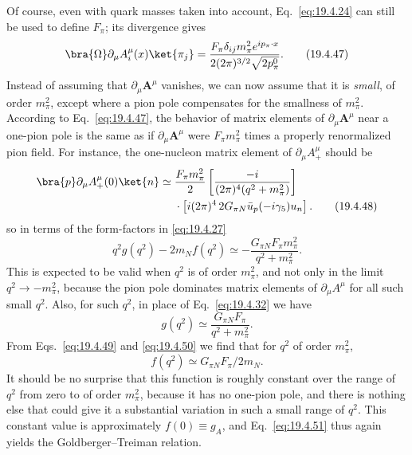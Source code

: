 Of course, even with quark masses taken into account, Eq.~\eqref{eq:19.4.24} can still be used to define $F_\pi$; its divergence gives
\begin{equation}
\bra{\Omega}\partial_\mu A_i^\mu(x)\ket{\pi_j}
=\frac{F_\pi\delta_{ij}m_\pi^2e^{ip_\pi\cdot x}}
{2(2\pi)^{3/2}\sqrt{2p_\pi^0}}.
\tag{19.4.47}\label{eq:19.4.47}
\end{equation}
Instead of assuming that $\partial_\mu\mathbf{A}^\mu$ vanishes, we can now assume that it is \emph{small}, of order $m_\pi^2$, except where a pion pole compensates for the smallness of $m_\pi^2$. According to Eq.~\eqref{eq:19.4.47}, the behavior of matrix elements of $\partial_\mu\mathbf{A}^\mu$ near a one-pion pole is the same as if $\partial_\mu\mathbf{A}^\mu$ were $F_\pi m_\pi^2$ times a properly renormalized pion field. For instance, the one-nucleon matrix element of $\partial_\mu A_+^\mu$ should be
\begin{align}
\bra{p}\partial_\mu A_+^\mu(0)\ket{n}
\simeq{}&
\frac{F_\pi m_\pi^2}{2}
\left[\frac{-i}{(2\pi)^4(q^2+m_\pi^2)}\right]
\notag\\
&\cdot
\left[i(2\pi)^4\,2G_{\pi N}
\bar u_p(-i\gamma_5)u_n\right].
\tag{19.4.48}\label{eq:19.4.48}
\end{align}
so in terms of the form-factors in \eqref{eq:19.4.27}
\begin{equation}
q^2g(q^2)-2m_Nf(q^2)
\simeq-\frac{G_{\pi N}F_\pi m_\pi^2}
{q^2+m_\pi^2}.
\tag{19.4.49}\label{eq:19.4.49}
\end{equation}
This is expected to be valid when $q^2$ is of order $m_\pi^2$, and not only in the limit $q^2\to-m_\pi^2$, because the pion pole dominates matrix elements of $\partial_\mu A^\mu$ for all such small $q^2$. Also, for such $q^2$, in place of Eq.~\eqref{eq:19.4.32} we have
\begin{equation}
g(q^2)\simeq\frac{G_{\pi N}F_\pi}{q^2+m_\pi^2}.
\tag{19.4.50}\label{eq:19.4.50}
\end{equation}
From Eqs.~\eqref{eq:19.4.49} and \eqref{eq:19.4.50} we find that for $q^2$ of order $m_\pi^2$,
\begin{equation}
f(q^2)\simeq G_{\pi N}F_\pi/2m_N.
\tag{19.4.51}\label{eq:19.4.51}
\end{equation}
It should be no surprise that this function is roughly constant over the range of $q^2$ from zero to of order $m_\pi^2$, because it has no one-pion pole, and there is nothing else that could give it a substantial variation in such a small range of $q^2$. This constant value is approximately $f(0)\equiv g_A$, and Eq.~\eqref{eq:19.4.51} thus again yields the Goldberger--Treiman relation.

